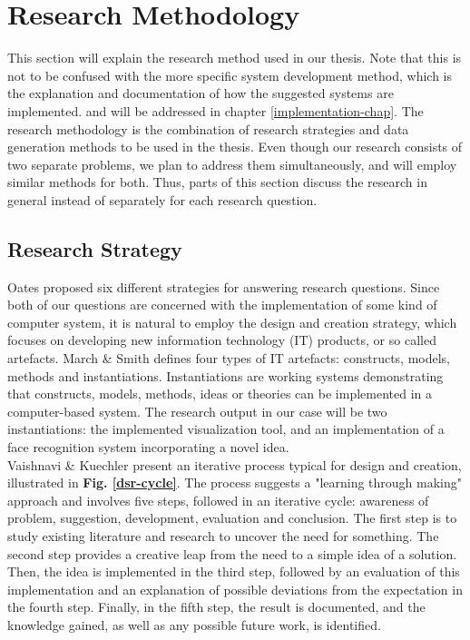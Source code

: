\section{Research Methodology}

This section will explain the research method used in our thesis. Note that this is not to be confused with the more specific system development method, which is the explanation and documentation of how the suggested systems are implemented. and will be addressed in chapter \ref{implementation-chap}. The research methodology is the combination of research strategies and data generation methods to be used in the thesis. Even though our research consists of two separate problems, we plan to address them simultaneously, and will employ similar methods for both. Thus, parts of this section discuss the research in general instead of separately for each research question.

\subsection{Research Strategy}

Oates \cite{oates} proposed six different strategies for answering research questions. Since both of our questions are concerned with the implementation of some kind of computer system, it is natural to employ the design and creation strategy, which focuses on developing new information technology (IT) products, or so called artefacts. March \& Smith \cite{march-smith} defines four types of IT artefacts: constructs, models, methods and instantiations. Instantiations are working systems demonstrating that constructs, models, methods, ideas or theories can be implemented in a computer-based system. The research output in our case will be two instantiations: the implemented visualization tool, and an implementation of a face recognition system incorporating a novel idea. \\

\noindent Vaishnavi \& Kuechler \cite{designscience} present an iterative process typical for design and creation, illustrated in \textbf{Fig. \ref{dsr-cycle}}. The process suggests a "learning through making" approach and involves five steps, followed in an iterative cycle: awareness of problem, suggestion, development, evaluation and conclusion. The first step is to study existing literature and research to uncover the need for something. The second step provides a creative leap from the need to a simple idea of a solution. Then, the idea is implemented in the third step, followed by an evaluation of this implementation and an explanation of possible deviations from the expectation in the fourth step. Finally, in the fifth step, the result is documented, and the knowledge gained, as well as any possible future work, is identified. \\

